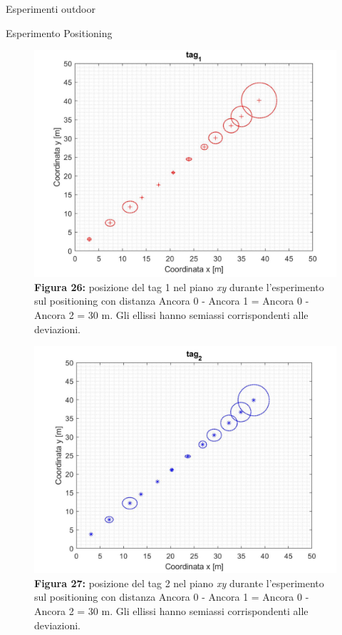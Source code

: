 \documentclass[12pt]{report}
\begin{document}
\begin{section}{Esperimenti outdoor}
\begin{subsection}{Esperimento Positioning}
			\begin{figure}[H]
				\centering
				\includegraphics[scale=0.3]{EspOutPos30_1}
	 			\caption{\textbf{Figura 26:} posizione del tag 1 nel piano \textit{xy} durante l'esperimento sul positioning con distanza Ancora 0 - Ancora 1 = Ancora 0 - Ancora 2 = 30 m. Gli ellissi hanno semiassi corrispondenti alle deviazioni.\label{EspOutPos30_1}}
			\end{figure}

			\begin{figure}[H]
				\centering
				\includegraphics[scale=0.3]{EspOutPos30_2}
	 			\caption{\textbf{Figura 27:} posizione del tag 2 nel piano \textit{xy} durante l'esperimento sul positioning con distanza Ancora 0 - Ancora 1 = Ancora 0 - Ancora 2 = 30 m. Gli ellissi hanno semiassi corrispondenti alle deviazioni.\label{EspOutPos30_2}}
			\end{figure}


\end{subsection}
\end{section}
\end{document}
